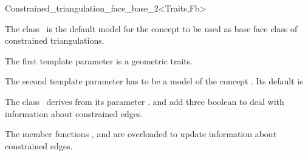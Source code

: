 

\begin{ccRefClass}{Constrained_triangulation_face_base_2<Traits,Fb>}  %


\ccDefinition
 The class \ccRefName\ is the default model for the concept
 to be used as base face class
of constrained triangulations.


\ccIsModel
{}

\ccParameters
The first template parameter is a geometric traits.

The second template parameter has to be a model
of the concept .
Its default is 

\ccInheritsFrom
The class \ccRefName\  derives from its parameter .
and add three boolean to deal with information about
constrained edges.

The member functions , 
and  are overloaded  to update
information about constrained edges.

\ccSeeAlso
{} \\
\\
 \\


\end{ccRefClass}


